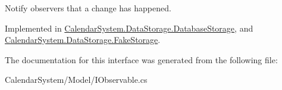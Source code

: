 Notify observers that a change has happened. 



Implemented in \hyperlink{class_calendar_system_1_1_data_storage_1_1_database_storage_a9dde52dd67fc234b5f4ed217801968af}{Calendar\+System.\+Data\+Storage.\+Database\+Storage}, and \hyperlink{class_calendar_system_1_1_data_storage_1_1_fake_storage_ad141dac914a11365efa50b8bf1bcc80d}{Calendar\+System.\+Data\+Storage.\+Fake\+Storage}.



The documentation for this interface was generated from the following file\+:\begin{DoxyCompactItemize}
\item 
Calendar\+System/\+Model/I\+Observable.\+cs\end{DoxyCompactItemize}
